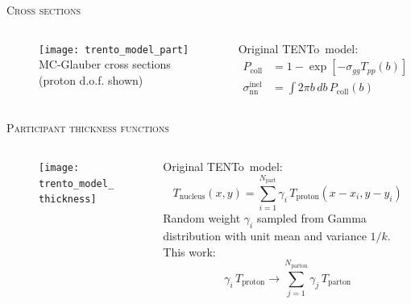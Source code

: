 \documentclass[aspectratio=169]{beamer}
\newcommand{\trento}{T\raisebox{-0.3ex}{R}ENTo}
\begin{document}
\begin{frame}[t]{\scshape Cross sections}
  \begin{columns}[T]
    \begin{column}{.5\textwidth}
      \begin{figure}
        \texttt{[image: trento\_model\_part]}\\
        \small MC-Glauber cross sections\\
        (proton d.o.f. shown)
      \end{figure}
    \end{column}
    \begin{column}{.5\textwidth}
      \centering \bigskip
      \textcolor{theme}{Original \trento\ model:}
      \begin{align*}
        P_\text{coll} &= 1 - \exp[-\sigma_{gg} T_{pp}(b)] \\
        \sigma_\text{nn}^\text{inel} &= \int 2\pi b\, db\, P_\text{coll}(b)
      \end{align*}
    \end{column}
  \end{columns}
\end{frame}

\begin{frame}[t]{\scshape Participant thickness functions}
  \begin{columns}[T]
    \begin{column}{.5\textwidth}
      \begin{figure}
        \texttt{[image: trento\_model\_thickness]}
      \end{figure}
    \end{column}
    \begin{column}{.5\textwidth}
      \centering \bigskip
      \textcolor{theme}{Original \trento\ model:}
      \begin{equation*}
        T_\text{nucleus}(x, y) = \sum\limits_{i=1}^{N_\text{part}}
        \gamma_i\, T_\text{proton}(x - x_i, y - y_i)
      \end{equation*}
      {\small Random weight $\gamma_i$ sampled from Gamma distribution with unit mean
      and variance $1/k$.}\\[2ex]
      \textcolor{theme}{This work:}
      \begin{equation*}
        \gamma_i\, T_\text{proton} \rightarrow \sum\limits_{j=1}^{N_\text{parton}}
        \gamma_j\,T_\text{parton} 
      \end{equation*}
    \end{column}
  \end{columns}
\end{frame}
\end{document}
